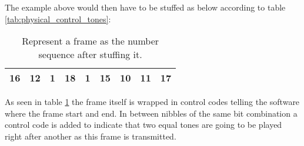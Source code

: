 	The example above would then have to be stuffed as below according to table \ref{tab:physical_control_tones}:
	
	\begin{table}[htb]
		\begin{center}
			\begin{tabular}{|c|c|c|c|c|c|c|c|c|}
			\hline
			16 & 12 & 1 & 18 & 1 & 15 & 10 & 11 & 17 \\
			\hline
			\end{tabular}
		\end{center}
		\caption{Represent a frame as the number sequence after stuffing it.}
		\label{tab:physical_stuffed_frame}
	\end{table}
	
	As seen in table \ref{tab:physical_stuffed_frame} the frame itself is wrapped in control codes telling the software where
	the frame start and end. In between nibbles of the same bit combination a control code is added to indicate that two equal
	tones are going to be played right after another as this frame is transmitted.